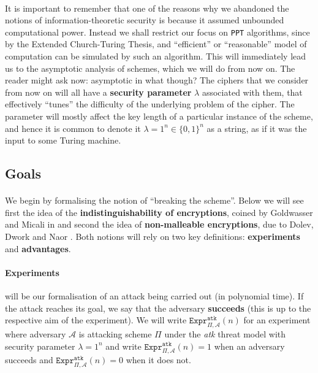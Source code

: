 \documentclass{article}
\theoremstyle{definition}
\newcommand{\A}{\mathcal{A}}
\newcommand{\PPT}{\texttt{PPT}}
\newcommand{\Expr}[2]{\texttt{Expr}^{\texttt{#1}}_{#2}}
\begin{document}
\paragraph{} It is important to remember that one of the reasons why we
abandoned the notions of information-theoretic security is because it assumed
unbounded computational power. Instead we shall restrict our focus on \PPT
algorithms, since by the Extended Church-Turing Thesis, and ``efficient'' or ``reasonable'' model
of computation can be simulated by such an algorithm. This will immediately
lead us to the asymptotic analysis of schemes, which we will do from now on. The
reader might ask now: asymptotic in what though? The ciphers that we consider
from now on will all have a \textbf{security parameter} $\lambda$ associated
with them, that effectively ``tunes'' the difficulty of the underlying problem
of the cipher. The parameter will mostly affect the key length of a particular instance
of the scheme, and hence it is common to denote it $\lambda = 1^n \in \{0,
1\}^n$ as a string, as if it was the input to some Turing machine.
\subsection{Goals}
\paragraph{}
We begin by formalising the notion of ``breaking the scheme''. Below we will see
first the idea of the \textbf{indistinguishability of encryptions}, coined by Goldwasser and Micali in
\cite{goldwasser1984probabilistic} and second the idea of \textbf{non-malleable
  encryptions}, due to Dolev, Dwork and Naor \cite{dolev2003nonmalleable}. Both
notions will rely on two key definitions: \textbf{experiments} and
\textbf{advantages}.
\paragraph{Experiments} will be our formalisation of an attack being carried
out (in polynomial time). If the attack reaches its goal, we say that the adversary \textbf{succeeds}
(this is up to the respective aim of the experiment). We will write
$\Expr{atk}{\Pi, \A}(n)$ for an experiment where adversary $\A$ is attacking scheme
$\Pi$ under the \textit{atk} threat model with security parameter $\lambda =
1^n$ and write $\Expr{atk}{\Pi, \A}(n) = 1$ when an adversary succeeds and $\Expr{atk}{\Pi, \A}(n) = 0$ when
it does not.
\end{document}
